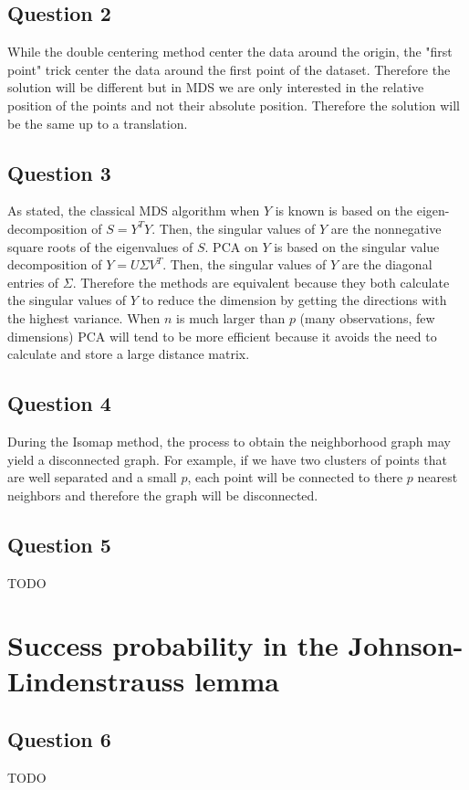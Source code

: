 \documentclass{article}
\begin{document}
\subsection{Question 2}
While the double centering method center the data around the origin, the "first point" trick center the data around the first point of the dataset. Therefore the solution will be different but in MDS we are only interested in the relative position of the points and not their absolute position. Therefore the solution will be the same up to a translation.

\subsection{Question 3}
As stated, the classical MDS algorithm when $Y$ is known is based on the eigen-decomposition of $S = Y^T Y$. Then, the singular values of $Y$ are the nonnegative square roots of the eigenvalues of $S$.
PCA on $Y$ is based on the singular value decomposition of $Y = U \Sigma V^T$. Then, the singular values of $Y$ are the diagonal entries of $\Sigma$. Therefore the methods are equivalent because they both calculate the singular values of $Y$ to reduce the dimension by getting the directions with the highest variance.
When $n$ is much larger than $p$ (many observations, few dimensions) PCA will tend to be more efficient because it avoids the need to calculate and store a large distance matrix.

\subsection{Question 4}
During the Isomap method, the process to obtain the neighborhood graph may yield a disconnected graph. For example, if we have two clusters of points that are well separated and a small $p$, each point will be connected to there $p$ nearest neighbors and therefore the graph will be disconnected.

\subsection{Question 5}
TODO

\section{Success probability in the Johnson-Lindenstrauss lemma}

\subsection{Question 6}
TODO
\end{document}
